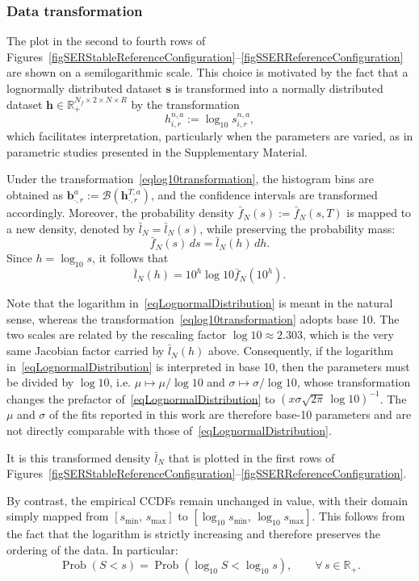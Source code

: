 \documentclass[a4paper]{article}
\newcommand{\R}{\mathbb{R}}
\begin{document}
\subsubsection{Data transformation}
The plot in the second to fourth rows of Figures~\ref{figSERStableReferenceConfiguration}--\ref{figSSERReferenceConfiguration} are shown on a semilogarithmic scale. This choice is motivated by the fact that a lognormally distributed dataset $\mathbf s$ is transformed into a normally distributed dataset $\mathbf h\in\R_+^{N_f\times2\times N\times R}$ by the transformation
\begin{equation}
    h_{i,r}^{n,a}:=\log_{10}{s_{i,r}^{n,a}},
    \label{eqlog10transformation}
\end{equation}    
which facilitates interpretation, particularly when the parameters are varied, as in parametric studies presented in the Supplementary Material.

Under the transformation~\eqref{eqlog10transformation}, the histogram bins are obtained as $\mathbf b^a_{\cdot,r}:=\mathcal{B}(\mathbf h^{T,a}_{\cdot,r})$, and the confidence intervals are transformed accordingly. Moreover, the probability density $\bar f_N(s):=\bar f_N(s,T)$ is mapped to a new density, denoted by $\bar l_N=\bar l_N(s)$, while preserving the probability mass:
$$ \bar f_N(s)\,ds=\bar l_N(h)\,dh. $$
Since $h=\log_{10}{s}$, it follows that
$$ \bar l_N(h)=10^h\log{10}\bar f_N(10^h). $$

Note that the logarithm in~\eqref{eqLognormalDistribution} is meant in the natural sense, whereas the transformation~\eqref{eqlog10transformation} adopts base 10. The two scales are related by the rescaling factor $\log{10}\approx2.303$, which is the very same Jacobian factor carried by $\bar l_N(h)$ above. Consequently, if the logarithm in~\eqref{eqLognormalDistribution} is interpreted in base 10, then the parameters must be divided by $\log{10}$, i.e. $\mu\mapsto\mu/\log{10}$ and $\sigma\mapsto\sigma/\log{10}$, whose transformation changes the prefactor of~\eqref{eqLognormalDistribution} to $\left(x\sigma\sqrt{2\pi}\,\log{10}\right)^{-1}$. The $\mu$ and $\sigma$ of the fits reported in this work are therefore base-10 parameters and are not directly comparable with those of~\eqref{eqLognormalDistribution}.

It is this transformed density $\bar l_N$ that is plotted in the first rows of Figures~\ref{figSERStableReferenceConfiguration}--\ref{figSSERReferenceConfiguration}.

By contrast, the empirical CCDFs remain unchanged in value, with their domain simply mapped from $[s_{\min},\,s_{\max}]$ to $[\log_{10}{s_{\min}},\,\log_{10}{s_{\max}}]$. This follows from the fact that the logarithm is strictly increasing and therefore preserves the ordering of the data. In particular:
$$ \operatorname{Prob}(S<s)=\operatorname{Prob}(\log_{10}{S}<\log_{10}{s}), \qquad \forall\,s\in\R_+. $$
\end{document}
